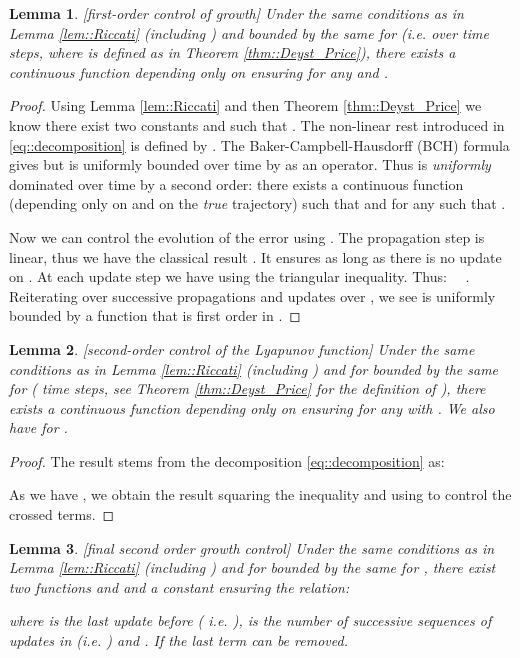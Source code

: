 \documentclass[a4paper,12pt,onecolumn]{article}
\newtheorem{lem}{Lemma}
\begin{document}
\begin{lem}\emph{[first-order control of growth]}
Under the same conditions as in Lemma \ref{lem::Riccati} (including ) and  bounded by the same  for  (i.e. over  time steps, where  is defined as in Theorem \ref{thm::Deyst_Price}), there exists a continuous function  depending \emph{only} on  ensuring  for any  and .
\label{lem::first_order}
\end{lem}
\begin{proof}
Using Lemma \ref{lem::Riccati} and then Theorem \ref{thm::Deyst_Price} we know there exist two constants  and  such that . The non-linear rest  introduced in \eqref{eq::decomposition} is defined by . The Baker-Campbell-Hausdorff (BCH) formula gives  but  is uniformly bounded over time by  as an operator. Thus  is \emph{uniformly} dominated over time by a second order: there exists a continuous function  (depending only on  and on the \emph{true} trajectory) such that  and  for any  such that .

Now we can control the evolution of the error using . The propagation step is linear, thus we have the classical result . It ensures  as long as there is no update on . At each update step we have   using the triangular inequality. Thus: ~~. Reiterating over successive propagations and updates  over ,  we see   is uniformly bounded by a  function  that is first order in .

\end{proof}



\begin{lem}\emph{[second-order control of the Lyapunov function]}
Under the same conditions as in Lemma \ref{lem::Riccati} (including )  and for  bounded by the same  for  ( time steps, see Theorem \ref{thm::Deyst_Price} for the definition of ), there exists a continuous function  depending \emph{only} on  ensuring  for any  with . We also have  for .
\label{lem::second_order}
\end{lem}
\begin{proof}
The result stems from the decomposition \eqref{eq::decomposition} as:

As we have , we obtain the result squaring the inequality and using   to control the crossed terms.
\end{proof}


\begin{lem}\emph{[final second order growth control]}
Under the same conditions as in Lemma \ref{lem::Riccati} (including )  and for  bounded by the same  for , there exist two functions  and  and a constant  ensuring the relation:

where  is the last update before  ( i.e. ),  is the number of successive sequences of  updates in  (i.e. ) and . If  the last term can be removed.
\label{lem::Lyapounov}
\end{lem}
\end{document}
